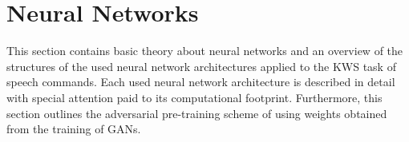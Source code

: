 
\chapter{Neural Networks}\label{sec:nn}
This section contains basic theory about neural networks and an overview of the structures of the used neural network architectures applied to the KWS task of speech commands.
Each used neural network architecture is described in detail with special attention paid to its computational footprint.
Furthermore, this section outlines the adversarial pre-training scheme of using weights obtained from the training of GANs.





